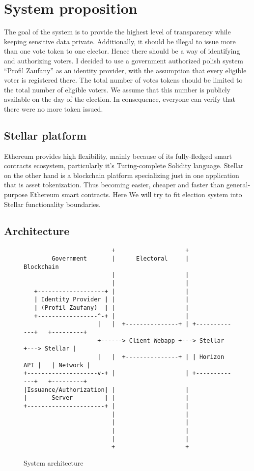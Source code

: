 \documentclass[runningheads]{llncs}
\begin{document}
\section{System proposition}
The goal of the system is to provide the highest level of transparency while keeping sensitive data private. Additionally, it should be illegal to issue more than one vote token to one elector. Hence there should be a way of identifying and authorizing voters. I decided to use a government authorized polish system
“Profil Zaufany” as an identity provider, with the assumption that every eligible voter is registered there. The total number of votes tokens should be limited to the total number of eligible voters. We assume that this number is publicly available on the day of the election. In consequence, everyone can verify that there were no more token issued. 

\subsection{Stellar platform}
Ethereum provides high flexibility, mainly because of its fully-fledged smart contracts ecosystem, particularly it’s Turing-complete Solidity language. Stellar on the other hand is a blockchain platform specializing just in one application that is asset tokenization. Thus becoming easier, cheaper and faster than general-purpose Ethereum smart contracts. Here We will try to fit election system into Stellar functionality boundaries.


\subsection{Architecture}
\begin{figure}
\begin{verbatim}
                         +                    +
        Government       |      Electoral     |      Blockchain
                         |                    |
                         |                    |
   +-------------------+ |                    |
   | Identity Provider | |                    |
   | (Profil Zaufany)  | |                    |
   +-----------------^-+ |                    |
                     |   |  +---------------+ | +-------------+   +---------+
                     +------> Client Webapp +---> Stellar     +---> Stellar |
                     |   |  +---------------+ | | Horizon API |   | Network |
+--------------------v-+ |                    | +-------------+   +---------+
|Issuance/Authorization| |                    |
|       Server         | |                    |
+----------------------+ |                    |
                         |                    |
                         |                    |
                         |                    |
                         |                    |
                         +                    +

\end{verbatim}
\caption{System architecture}
\label{fig:ascii-box}
\end{figure} 
\end{document}
